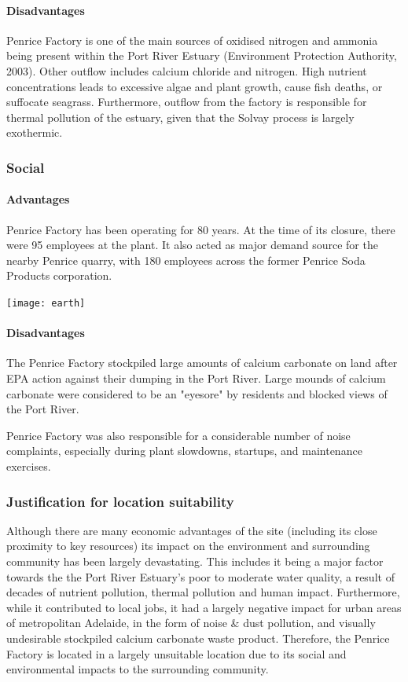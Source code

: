 \documentclass[12pt, a4paper]{article}
\begin{document}
\paragraph{Disadvantages}
Penrice Factory is one of the main sources of oxidised nitrogen and ammonia being present within the Port River Estuary (Environment Protection Authority, 2003). Other outflow includes calcium chloride and nitrogen. High nutrient concentrations leads to excessive algae and plant growth, cause fish deaths, or suffocate seagrass. Furthermore, outflow from the factory is responsible for thermal pollution of the estuary, given that the Solvay process is largely exothermic. 

\subsubsection{Social}

\paragraph{Advantages}
Penrice Factory has been operating for 80 years. At the time of its closure, there were 95 employees at the plant. It also acted as major demand source for the nearby Penrice quarry, with 180 employees across the former Penrice Soda Products corporation.

\begin{center}
\texttt{[image: earth]}
\\
\end{center}

\paragraph{Disadvantages}

The Penrice Factory stockpiled large amounts of calcium carbonate on land after EPA action against their dumping in the Port River. Large mounds of calcium carbonate were considered to be an "eyesore" by residents and blocked views of the Port River. 

Penrice Factory was also responsible for a considerable number of noise complaints, especially during plant slowdowns, startups, and maintenance exercises.

\subsubsection{Justification for location suitability}

Although there are many economic advantages of the site (including its close proximity to key resources) its impact on the environment and surrounding community has been largely devastating. This includes it being a major factor towards the the Port River Estuary's poor to moderate water quality, a result of decades of nutrient pollution, thermal pollution and human impact. Furthermore, while it contributed to local jobs, it had a largely negative impact for urban areas of metropolitan Adelaide, in the form of noise \& dust pollution, and visually undesirable stockpiled calcium carbonate waste product. Therefore, the Penrice Factory is located in a largely unsuitable location due to its social and environmental impacts to the surrounding community. 
\end{document}
